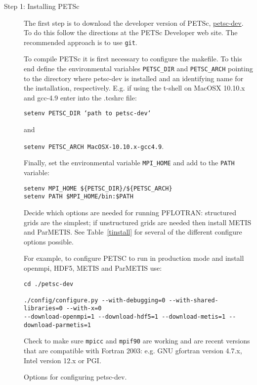 \begin{description}
\item[Step 1: Installing PETSc] The first step is to download the developer version of PETSc, \href{http://www.mcs.anl.gov/petsc/developers/index.html}{petsc-dev}. To do this follow the directions at the PETSc Developer web site. The recommended approach is to use {\tt git}.

To compile PETSc it is first necessary to configure the makefile. To this end define the environmental variables {\footnotesize\tt PETSC\_DIR} and {\footnotesize\tt PETSC\_ARCH} pointing to the directory where petsc-dev is installed and an identifying name for the installation, respectively. E.g. if using the t-shell on MacOSX 10.10.x and gcc-4.9 enter into the .tcshrc file:

{\footnotesize\tt setenv PETSC\_DIR `path to petsc-dev`}

and

{\footnotesize\tt setenv PETSC\_ARCH MacOSX-10.10.x-gcc4.9}.

Finally, set the environmental variable {\footnotesize\tt MPI\_HOME} and add to the {\footnotesize\tt PATH} variable:
\footnotesize
\begin{Verbatim}
setenv MPI_HOME ${PETSC_DIR}/${PETSC_ARCH}
setenv PATH $MPI_HOME/bin:$PATH
\end{Verbatim}
\normalsize
Decide which options are needed for running PFLOTRAN: structured grids are the simplest; if unstructured grids are needed then install METIS and ParMETIS. See Table~\ref{tinstall} for several of the different configure options possible.

For example, to configure PETSC to run in production mode and install openmpi, HDF5, METIS and ParMETIS use:
\footnotesize
\begin{Verbatim}
cd ./petsc-dev

./config/configure.py --with-debugging=0 --with-shared-libraries=0 --with-x=0 
--download-openmpi=1 --download-hdf5=1 --download-metis=1 --download-parmetis=1
\end{Verbatim}
\normalsize

\noindent
Check to make sure {\footnotesize\tt mpicc} and {\footnotesize\tt mpif90} are working and are recent versions that are compatible with Fortran 2003: e.g. GNU gfortran version 4.7.x, Intel version 12.x or PGI.

\begin{table}[H]\centering
\caption{Options for configuring petsc-dev.}
\label{tinstall}


\end{table}
\end{description}
